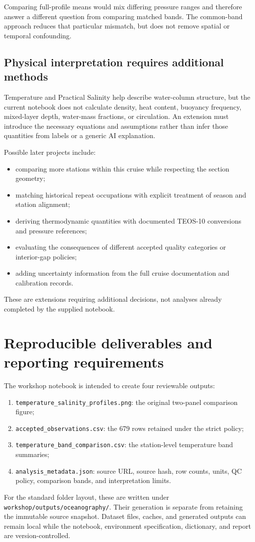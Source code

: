 \documentclass[11pt,letterpaper]{article}
\newcommand{\field}[1]{\nolinkurl{#1}}
\begin{document}
Comparing full-profile means would mix differing pressure ranges and therefore answer a different question from comparing matched bands. The common-band approach reduces that particular mismatch, but does not remove spatial or temporal confounding.

\subsection{Physical interpretation requires additional methods}
Temperature and Practical Salinity help describe water-column structure, but the current notebook does not calculate density, heat content, buoyancy frequency, mixed-layer depth, water-mass fractions, or circulation. An extension must introduce the necessary equations and assumptions rather than infer those quantities from labels or a generic AI explanation.

Possible later projects include:
\begin{itemize}
  \item comparing more stations within this cruise while respecting the section geometry;
  \item matching historical repeat occupations with explicit treatment of season and station alignment;
  \item deriving thermodynamic quantities with documented TEOS-10 conversions and pressure references;
  \item evaluating the consequences of different accepted quality categories or interior-gap policies;
  \item adding uncertainty information from the full cruise documentation and calibration records.
\end{itemize}
These are extensions requiring additional decisions, not analyses already completed by the supplied notebook.

\section{Reproducible deliverables and reporting requirements}
\label{sec:deliverables}

The workshop notebook is intended to create four reviewable outputs:
\begin{enumerate}
  \item \field{temperature_salinity_profiles.png}: the original two-panel comparison figure;
  \item \field{accepted_observations.csv}: the 679 rows retained under the strict policy;
  \item \field{temperature_band_comparison.csv}: the station-level temperature band summaries;
  \item \field{analysis_metadata.json}: source URL, source hash, row counts, units, QC policy, comparison bands, and interpretation limits.
\end{enumerate}
For the standard folder layout, these are written under \field{workshop/outputs/oceanography/}. Their generation is separate from retaining the immutable source snapshot. Dataset files, caches, and generated outputs can remain local while the notebook, environment specification, dictionary, and report are version-controlled.
\end{document}
